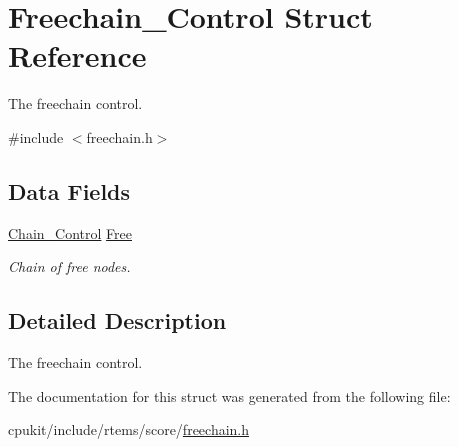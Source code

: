 \hypertarget{structFreechain__Control}{}\section{Freechain\+\_\+\+Control Struct Reference}
\label{structFreechain__Control}


The freechain control.  




{\ttfamily \#include $<$freechain.\+h$>$}

\subsection*{Data Fields}
\begin{DoxyCompactItemize}
\item 
\mbox{\label{structFreechain__Control_a89d6f832df22d0106b98072e85d08961}} 
\mbox{\hyperlink{unionChain__Control}{Chain\+\_\+\+Control}} \mbox{\hyperlink{structFreechain__Control_a89d6f832df22d0106b98072e85d08961}{Free}}
\begin{DoxyCompactList}\small\item\em Chain of free nodes. \end{DoxyCompactList}\end{DoxyCompactItemize}


\subsection{Detailed Description}
The freechain control. 

The documentation for this struct was generated from the following file\+:\begin{DoxyCompactItemize}
\item 
cpukit/include/rtems/score/\mbox{\hyperlink{freechain_8h}{freechain.\+h}}\end{DoxyCompactItemize}

